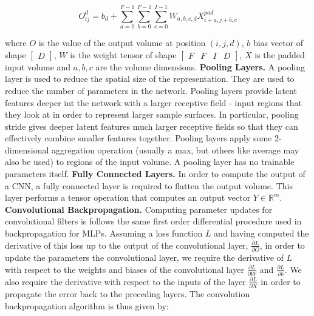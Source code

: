\begin{equation}
	O_{ij}^{d} = b_d + \sum_{a=0}^{F - 1}\sum_{b=0}^{F - 1}\sum_{c=0}^{I - 1}W_{a,b,c,d}X_{i+a,j+b,c}^{pad}
\end{equation}

where $O$ is the value of the output volume at position $(i,j,d)$, $b$ bias vector of shape $\left [ \begin{matrix} D \end{matrix} \right]$, $W$ is the weight tensor of shape $\left [ \begin{matrix} F & F & I & D \end{matrix} \right]$, $X$ is the padded input volume and $a, b, c$ are the volume dimensions. \newline
\textbf{Pooling Layers.} A pooling layer is used to reduce the spatial size of the representation. They are used to reduce the number of parameters in the network. Pooling layers provide latent features deeper int the network with a larger receptive field - input regions that they look at in order to represent larger sample surfaces. In particular, pooling stride gives deeper latent features much larger receptive fields so that they can effectively combine smaller features together. Pooling layers apply some 2-dimensional aggregation operation (usually a max, but others like average may also be used) to regions of the input volume. A pooling layer has no trainable parameters itself.  \newline
\textbf{Fully Connected Layers.} In order to compute the output of a CNN, a fully connected layer is required to flatten the output volume. This layer performs a tensor operation that computes an output vector $Y \in \mathbb{R}^{m}$. \newline
\textbf{Convolutional Backpropagation.} Computing parameter updates for convolutional filters is follows the same first order differential procedure used in backpropagation for MLPs. Assuming a loss function $L$ and having computed the derivative of this loss up to the output of the convolutional layer, $\frac{\partial L} {\partial O}$, in order to update the parameters the convolutional layer, we require the derivative of $L$ with respect to the weights and biases of the convolutional layer $\frac{\partial L} {\partial W}$ and $\frac{\partial L} {\partial b}$. We also require the derivative with respect to the inputs of the layer $\frac{\partial L} {\partial X}$ in order to propagate the error back to the preceding layers. \newline
The convolution backpropagation algorithm is thus given by:

